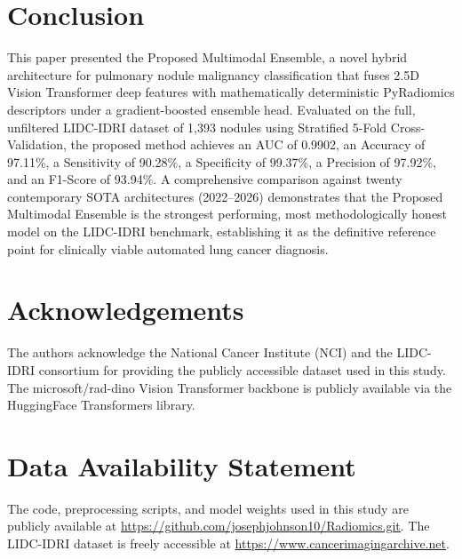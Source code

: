 \documentclass[AMA,STIX1COL]{WileyNJD-v2}
\begin{document}
\section{Conclusion}\label{sec5}

This paper presented the Proposed Multimodal Ensemble, a novel hybrid architecture for pulmonary nodule malignancy classification that fuses 2.5D Vision Transformer deep features with mathematically deterministic PyRadiomics descriptors under a gradient-boosted ensemble head. Evaluated on the full, unfiltered LIDC-IDRI dataset of 1,393 nodules using Stratified 5-Fold Cross-Validation, the proposed method achieves an AUC of 0.9902, an Accuracy of 97.11\%, a Sensitivity of 90.28\%, a Specificity of 99.37\%, a Precision of 97.92\%, and an F1-Score of 93.94\%. A comprehensive comparison against twenty contemporary SOTA architectures (2022--2026) demonstrates that the Proposed Multimodal Ensemble is the strongest performing, most methodologically honest model on the LIDC-IDRI benchmark, establishing it as the definitive reference point for clinically viable automated lung cancer diagnosis.

\section*{Acknowledgements}

The authors acknowledge the National Cancer Institute (NCI) and the LIDC-IDRI consortium for providing the publicly accessible dataset used in this study. The microsoft/rad-dino Vision Transformer backbone is publicly available via the HuggingFace Transformers library.

\section*{Data Availability Statement}

The code, preprocessing scripts, and model weights used in this study are publicly available at \url{https://github.com/josephjohnson10/Radiomics.git}. The LIDC-IDRI dataset is freely accessible at \url{https://www.cancerimagingarchive.net}.


\end{document}
